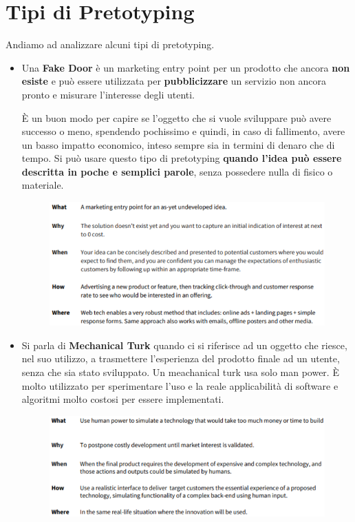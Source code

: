 \pagebreak

\section{Tipi di Pretotyping}
Andiamo ad analizzare alcuni tipi di pretotyping.
\begin{itemize}
	\item Una \textbf{Fake Door} è un marketing entry point per un prodotto che ancora \textbf{non esiste} e può essere utilizzata per \textbf{pubblicizzare} un servizio non ancora pronto e misurare l'interesse degli utenti.

	      È un buon modo per capire se l'oggetto che si vuole sviluppare può avere successo o meno, spendendo pochissimo e quindi, in caso di fallimento, avere un basso impatto economico, inteso sempre sia in termini di denaro che di tempo. Si può usare
	      questo tipo di pretotyping \textbf{quando l'idea può essere descritta in poche e semplici parole}, senza possedere nulla di fisico o materiale.

	      \begin{figure}[!h]
		      \centering
		      \includegraphics[scale=0.42]{immagini/Fake_door.png}
	      \end{figure}

	\item Si parla di \textbf{Mechanical Turk} quando ci si riferisce ad un oggetto che riesce, nel suo utilizzo, a trasmettere l'esperienza del prodotto finale ad un utente, senza che sia stato sviluppato. Un meachanical turk usa solo man power. È molto utilizzato per sperimentare l'uso e la reale applicabilità di software e algoritmi molto costosi per essere implementati.

	      \begin{figure}[!h]
		      \centering
		      \includegraphics[scale=0.42]{immagini/Mechanical_turk.png}
	      \end{figure}


\end{itemize}
